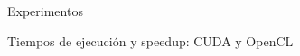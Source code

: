 \begin{frame}{Experimentos}
\begin{block}{Tiempos de ejecución y speedup: CUDA y OpenCL}

\begin{columns}
  \begin{column}{.50\textwidth}
	\centerline{
      }

  \end{column}
  \begin{column}{.50\textwidth}
    \centerline{
      }
  \end{column}
  \end{columns}
\end{block}
\end{frame}

